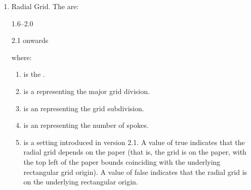 \begin{numbered}
\begin{enumerate}
\begin{enumerate}
\begin{enumerate}
       \item {} is a  representing the major
        grid division (in terms of the grid unit). For version 2.2
        onwards this is just for the horizontal $x$-axis.

       \item {} is a  representing the major
        grid division (in terms of the grid unit) for the vertical
        $y$-axis.

       \item {} is an  representing the grid subdivision.
        For version 2.2 onwards this is just for the horizontal $x$-axis;

       \item {} is an  representing the grid subdivision
       for the vertical $y$-axis.

     \end{enumerate}

     \item Radial Grid. The  are:
    \begin{jdrversion}{1.6--2.0}
    \begin{syntaxline}
       
    \end{syntaxline}
    \end{jdrversion}
    \begin{jdrversion}{2.1 onwards}
    \begin{syntaxline}
        
    \end{syntaxline}
    \end{jdrversion}
    where:
      \begin{enumerate}
       \item {} is the .

       \item {} is a  representing the major grid division.

       \item {} is an  representing the grid subdivision.

       \item {} is an  representing the number of spokes.

       \item {} is a  setting
       introduced in version 2.1. A value of true indicates that the
       radial grid depends on the paper (that is, the grid is
        on the paper, with the top left of the paper
       bounds coinciding with the underlying rectangular grid origin). 
       A value of false indicates that the radial grid is  
       on the underlying rectangular origin.
      \end{enumerate}


\end{enumerate}
\end{enumerate}
\end{numbered}
